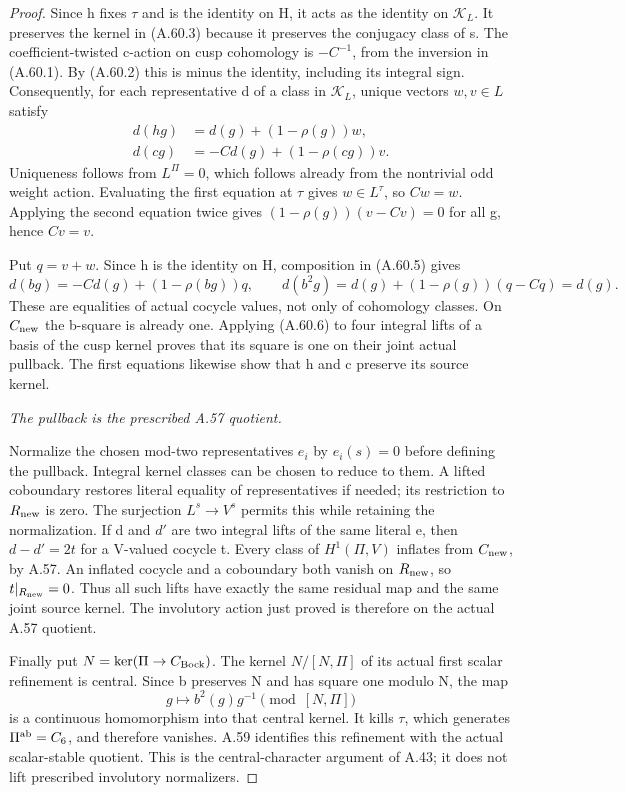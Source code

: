\begin{proof}
Since h fixes \(\tau\) and is the identity on H, it acts as
the identity on \(\mathcal K_L\). It preserves the kernel
in (A.60.3) because it preserves the conjugacy class of s.
The coefficient-twisted c-action on cusp cohomology is
\(-C^{-1}\), from the inversion in (A.60.1). By (A.60.2)
this is minus the identity, including its integral sign.
Consequently, for each representative d of a class in
\(\mathcal K_L\), unique vectors \(w,v\in L\) satisfy
\[
 \begin{aligned}
 d(hg)&=d(g)+(1-\rho(g))w,\\
 d(cg)&=-C d(g)+(1-\rho(cg))v.
 \end{aligned}
 \tag{A.60.5}
\]
Uniqueness follows from \(L^\Pi=0\), which follows already
from the nontrivial odd weight action. Evaluating the first
equation at \(\tau\) gives \(w\in L^\tau\), so \(Cw=w\).
Applying the second equation twice gives
\((1-\rho(g))(v-Cv)=0\) for all g, hence \(Cv=v\).

Put \(q=v+w\). Since h is the identity on H, composition
in (A.60.5) gives
\[
 d(bg)=-C d(g)+(1-\rho(bg))q,
 \qquad
 d(b^2g)=d(g)+(1-\rho(g))(q-Cq)=d(g).
 \tag{A.60.6}
\]
These are equalities of actual cocycle values, not only of
cohomology classes. On \(C_{\rm new}\) the b-square is already
one. Applying (A.60.6) to four integral lifts of a basis of
the cusp kernel proves that its square is one on their joint
actual pullback. The first equations likewise show that h
and c preserve its source kernel.

\emph{The pullback is the prescribed A.57 quotient.}\par
Normalize the chosen mod-two representatives \(e_i\) by
\(e_i(s)=0\) before defining the pullback. Integral kernel
classes can be chosen to reduce to them. A lifted coboundary
restores literal equality of representatives if needed; its
restriction to \(R_{\rm new}\) is zero. The surjection
\(L^s\to V^s\) permits this while retaining the normalization.
If d and \(d'\) are two integral lifts of the same literal e,
then \(d-d'=2t\) for a V-valued cocycle t. Every class of
\(H^1(\Pi,V)\) inflates from \(C_{\rm new}\), by A.57.
An inflated cocycle and a coboundary both vanish on
\(R_{\rm new}\), so \(t|_{R_{\rm new}}=0\).
Thus all such lifts have exactly the same residual map and
the same joint source kernel. The involutory action just
proved is therefore on the actual A.57 quotient.

Finally put \(N=\ker(\Pi\to C_{\rm Bock})\). The kernel
\(N/[N,\Pi]\) of its actual first scalar refinement is central.
Since b preserves N and has square one modulo N, the map
\[
 g\longmapsto b^2(g)g^{-1}\pmod{[N,\Pi]}
 \tag{A.60.7}
\]
is a continuous homomorphism into that central kernel. It kills
\(\tau\), which generates \(\Pi^{\rm ab}=C_6\), and therefore
vanishes. A.59 identifies this refinement with the actual
scalar-stable quotient. This is the central-character argument
of A.43; it does not lift prescribed involutory normalizers.
\end{proof}


